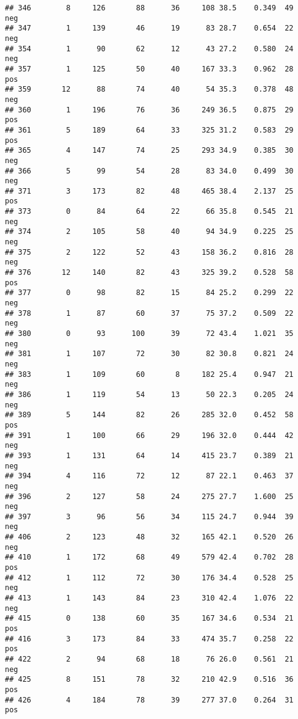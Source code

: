 \documentclass[
]{article}
\begin{document}
\begin{verbatim}
## 346        8     126       88      36     108 38.5    0.349  49      neg
## 347        1     139       46      19      83 28.7    0.654  22      neg
## 354        1      90       62      12      43 27.2    0.580  24      neg
## 357        1     125       50      40     167 33.3    0.962  28      pos
## 359       12      88       74      40      54 35.3    0.378  48      neg
## 360        1     196       76      36     249 36.5    0.875  29      pos
## 361        5     189       64      33     325 31.2    0.583  29      pos
## 365        4     147       74      25     293 34.9    0.385  30      neg
## 366        5      99       54      28      83 34.0    0.499  30      neg
## 371        3     173       82      48     465 38.4    2.137  25      pos
## 373        0      84       64      22      66 35.8    0.545  21      neg
## 374        2     105       58      40      94 34.9    0.225  25      neg
## 375        2     122       52      43     158 36.2    0.816  28      neg
## 376       12     140       82      43     325 39.2    0.528  58      pos
## 377        0      98       82      15      84 25.2    0.299  22      neg
## 378        1      87       60      37      75 37.2    0.509  22      neg
## 380        0      93      100      39      72 43.4    1.021  35      neg
## 381        1     107       72      30      82 30.8    0.821  24      neg
## 383        1     109       60       8     182 25.4    0.947  21      neg
## 386        1     119       54      13      50 22.3    0.205  24      neg
## 389        5     144       82      26     285 32.0    0.452  58      pos
## 391        1     100       66      29     196 32.0    0.444  42      neg
## 393        1     131       64      14     415 23.7    0.389  21      neg
## 394        4     116       72      12      87 22.1    0.463  37      neg
## 396        2     127       58      24     275 27.7    1.600  25      neg
## 397        3      96       56      34     115 24.7    0.944  39      neg
## 406        2     123       48      32     165 42.1    0.520  26      neg
## 410        1     172       68      49     579 42.4    0.702  28      pos
## 412        1     112       72      30     176 34.4    0.528  25      neg
## 413        1     143       84      23     310 42.4    1.076  22      neg
## 415        0     138       60      35     167 34.6    0.534  21      pos
## 416        3     173       84      33     474 35.7    0.258  22      pos
## 422        2      94       68      18      76 26.0    0.561  21      neg
## 425        8     151       78      32     210 42.9    0.516  36      pos
## 426        4     184       78      39     277 37.0    0.264  31      pos

\end{verbatim}
\end{document}
